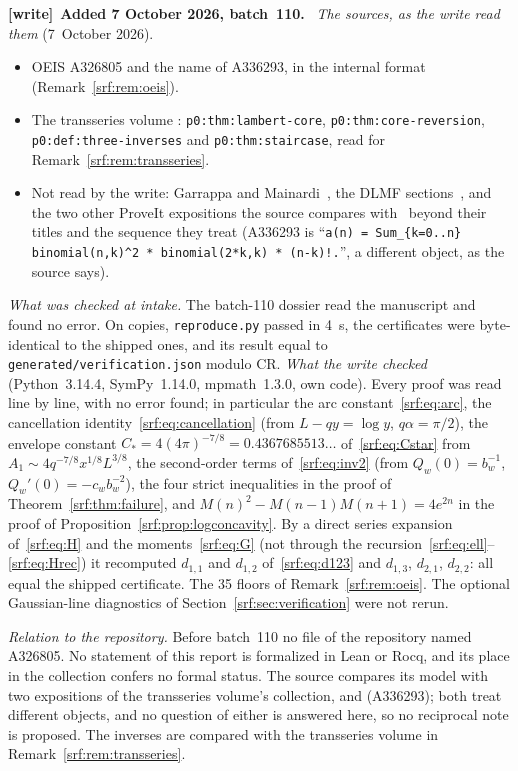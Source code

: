 \documentclass[11pt]{article}
\theoremstyle{remark}\newtheorem{remark}[theorem]{Remark}
\newcommand{\file}[1]{\nolinkurl{#1}}
\newenvironment{writenote}[1][]{\par\smallskip\begingroup\small
 \noindent\textbf{[write]}\if\relax\detokenize{#1}\relax\else~\textbf{#1.}\fi\ }%
 {\par\endgroup\smallskip}
\begin{document}
\begin{writenote}[Added 7 October 2026, batch~110]
\emph{The sources, as the write read them} (7~October 2026).
\begin{itemize}\raggedright
\item OEIS A326805 and the name of A336293, in the internal format
 (Remark~\ref{srf:rem:oeis}).
\item The transseries volume
 :
 \file{p0:thm:lambert-core}, \file{p0:thm:core-reversion},
 \file{p0:def:three-inverses} and \file{p0:thm:staircase}, read for
 Remark~\ref{srf:rem:transseries}.
\item Not read by the write: Garrappa and Mainardi~\cite{gm}, the DLMF
 sections~\cite{dlmfap,dlmfgamma}, and the two other ProveIt expositions the
 source compares with~\cite{action,late} beyond their titles and the
 sequence they treat (A336293 is
 ``\texttt{a(n) = Sum\_\{k=0..n\} binomial(n,k)\^{}2 * binomial(2*k,k) * (n-k)!.}'',
 a different object, as the source says).
\end{itemize}

\emph{What was checked at intake.} The batch-110 dossier read the
manuscript and found no error. On copies, \file{reproduce.py} passed in
4~s, the certificates were byte-identical to the shipped ones, and its
result equal to \file{generated/verification.json} modulo CR.
\emph{What the write checked} (Python~3.14.4, SymPy~1.14.0, mpmath~1.3.0,
own code). Every proof was read line by line, with no error found; in
particular the arc constant~\eqref{srf:eq:arc}, the cancellation
identity~\eqref{srf:eq:cancellation} (from $L-qy=\log y$, $q\alpha=\pi/2$),
the envelope constant $C_*=4(4\pi)^{-7/8}=0.4367685513\ldots$ of~\eqref{srf:eq:Cstar}
from $A_1\sim4q^{-7/8}x^{1/8}L^{3/8}$, the second-order terms
of~\eqref{srf:eq:inv2} (from $Q_w(0)=b_w^{-1}$, $Q_w'(0)=-c_wb_w^{-2}$), the
four strict inequalities in the proof of Theorem~\ref{srf:thm:failure}, and
$M(n)^2-M(n-1)M(n+1)=4e^{2n}$ in the proof of
Proposition~\ref{srf:prop:logconcavity}. By a direct series expansion
of~\eqref{srf:eq:H} and the moments~\eqref{srf:eq:G} (not through the
recursion~\eqref{srf:eq:ell}--\eqref{srf:eq:Hrec}) it recomputed $d_{1,1}$
and $d_{1,2}$ of~\eqref{srf:eq:d123} and $d_{1,3}$, $d_{2,1}$, $d_{2,2}$: all
equal the shipped certificate. The 35 floors of Remark~\ref{srf:rem:oeis}.
The optional Gaussian-line diagnostics of Section~\ref{srf:sec:verification}
were not rerun.

\emph{Relation to the repository.} Before batch~110 no file of the
repository named A326805. No statement of this report is formalized in Lean
or Rocq, and its place in the collection confers no formal status. The
source compares its model with two expositions of the transseries volume's
collection,
and
(A336293); both treat different objects, and no question of either is
answered here, so no reciprocal note is proposed. The inverses are compared
with the transseries volume in Remark~\ref{srf:rem:transseries}.
\end{writenote}
\end{document}

